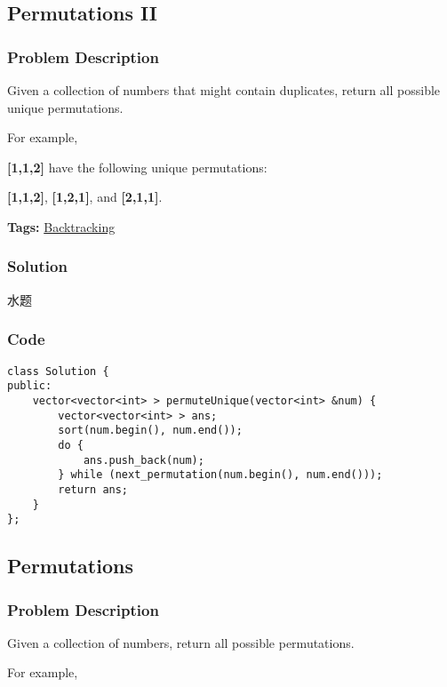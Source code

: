 \documentclass{article}
\begin{document}
\begin{CJK*}{UTF8}{gkai}
\begin{lstlisting}
\end{lstlisting}


\subsection{ Permutations II }
\label{ Permutations II }

\subsubsection*{Problem Description}
Given a collection of numbers that might contain duplicates, return all possible unique permutations.

For example,


\textbf{[1,1,2]} have the following unique permutations:


\textbf{[1,1,2]}, \textbf{[1,2,1]}, and \textbf{[2,1,1]}.


\textbf{Tags: }
\hyperref[ Backtracking ]{ Backtracking }



\subsubsection*{Solution}
水题

\subsubsection*{Code}
\begin{lstlisting}
class Solution {
public:
    vector<vector<int> > permuteUnique(vector<int> &num) {
        vector<vector<int> > ans;
        sort(num.begin(), num.end());
        do {
            ans.push_back(num);
        } while (next_permutation(num.begin(), num.end()));
        return ans;
    }
}; 
\end{lstlisting}


\subsection{ Permutations }
\label{ Permutations }

\subsubsection*{Problem Description}
Given a collection of numbers, return all possible permutations.

For example,



\end{CJK*}
\end{document}
